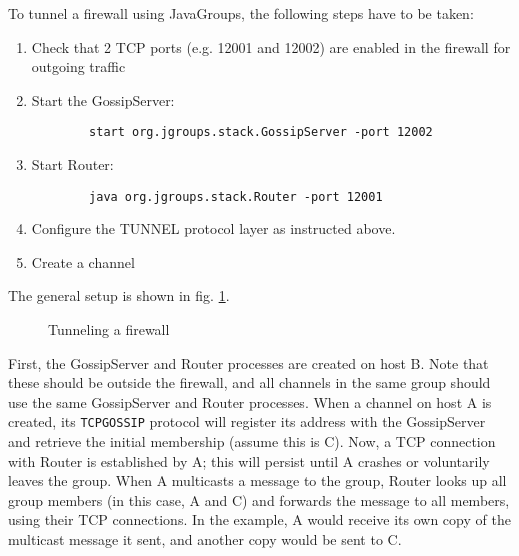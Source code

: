       To tunnel a firewall using JavaGroups, the following steps have to be taken:

      \begin{enumerate}

      \item Check that 2 TCP ports (e.g. 12001 and 12002) are enabled in the firewall
            for outgoing traffic
      \item Start the GossipServer:
        \begin{small}
	\begin{verbatim}
        start org.jgroups.stack.GossipServer -port 12002
      \end{verbatim}
      \end{small}


      \item Start Router:
        \begin{small}
	\begin{verbatim}
        java org.jgroups.stack.Router -port 12001
      \end{verbatim}
      \end{small}


      \item Configure the TUNNEL protocol layer as instructed above.

      \item Create a channel

      \end{enumerate}


      The general setup is shown in fig. \ref{TunnelingFig}.

      \begin{figure}[htb]
      \caption{Tunneling a firewall}
      \label{TunnelingFig}
      \end{figure}

      First, the GossipServer and Router processes are created on host B. Note that
      these should be outside the firewall, and all channels in the same group should
      use the same GossipServer and Router processes. When a channel on host A is
      created, its {\tt TCPGOSSIP} protocol will register its address with the
      GossipServer and retrieve the initial membership (assume this is C). Now, a TCP
      connection with Router is established by A; this will persist until A crashes
      or voluntarily leaves the group. When A multicasts a message to the group,
      Router looks up all group members (in this case, A and C) and forwards the
      message to all members, using their TCP connections. In the example, A would
      receive its own copy of the multicast message it sent, and another copy would
      be sent to C.
	
